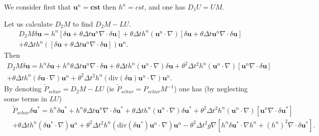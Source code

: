 \documentclass[a4paper, 11pt]{article}
\begin{document}
We consider first that $\boldsymbol{u}^n=\boldsymbol{cst}$ then $h^n=cst$, and one has $D_1U=UM$.

Let us calculate $D_2M$ to find $D_2M-LU$.
\begin{equation*}
\begin{split}
D_2M\delta \boldsymbol{u}=h^n\left[\delta \boldsymbol{u}+\theta\Delta t\boldsymbol{u}^n\nabla\cdot \delta \boldsymbol{u}\right]+\theta\Delta th^n\left(\boldsymbol{u}^n\cdot\nabla\right)\left[\delta \boldsymbol{u}+\theta\Delta t\boldsymbol{u}^n\nabla \cdot \delta \boldsymbol{u}\right]\\
+\theta\Delta th^n\left(\left[\delta \boldsymbol{u}+\theta\Delta t\boldsymbol{u}^n\nabla \cdot \delta \boldsymbol{u}\right]\right)\boldsymbol{u}^n.
\end{split}
\end{equation*}
Then
\begin{equation*}
\begin{split}
D_2M\delta \boldsymbol{u}=h^n\delta \boldsymbol{u}+h^n\theta\Delta t\boldsymbol{u}^n\nabla \cdot \delta \boldsymbol{u}+\theta\Delta th^n\left(\boldsymbol{u}^n\cdot \nabla \right)\delta \boldsymbol{u}+\theta^2\Delta t^2h^n\left(\boldsymbol{u}^n\cdot \nabla \right)\left[\boldsymbol{u}^n\nabla \cdot \delta \boldsymbol{u}\right]\\+\theta\Delta th^n\left(\delta \boldsymbol{u}\cdot \nabla \right)\boldsymbol{u}^n+\theta^2\Delta t^2h^n\left(\text{div}(\delta \boldsymbol{u})\boldsymbol{u}^n\cdot \nabla \right)\boldsymbol{u}^n.
\end{split}
\end{equation*}
By denoting $\tilde{P}_{schur}=D_2M-LU$ (ie $\tilde{P}_{schur}=P_{schur}M^{-1}$) one has (by neglecting some terms in $LU$)
\begin{equation*}
\begin{split}
&\tilde{P}_{schur}\delta \boldsymbol{u}^*=h^n\delta \boldsymbol{u}^*+h^n\theta\Delta t\boldsymbol{u}^n\nabla \cdot \delta \boldsymbol{u}^*+\theta\Delta th^n\left(\boldsymbol{u}^n\cdot \nabla \right)\delta \boldsymbol{u}^*+\theta^2\Delta t^2h^n\left(\boldsymbol{u}^n\cdot \nabla\right)\left[\boldsymbol{u}^n\nabla \cdot \delta \boldsymbol{u}^*\right]\\
&+\theta\Delta th^n\left(\delta \boldsymbol{u}^*\cdot \nabla\right)\boldsymbol{u}^n+\theta^2\Delta t^2h^n\left(\text{div}(\delta \boldsymbol{u}^*)\boldsymbol{u}^n\cdot \nabla\right)\boldsymbol{u}^n-\theta^2\Delta t^2g\nabla\left[h^n\delta \boldsymbol{u}^*\cdot \nabla h^n+(h^n)^2\nabla \cdot \delta \boldsymbol{u}^*\right].
\end{split}
\end{equation*}
\end{document}
